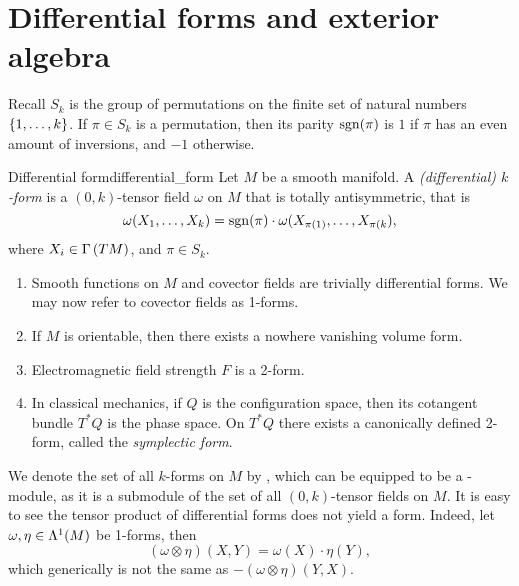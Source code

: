 \section{Differential forms and exterior algebra}

Recall \(S_k\) is the group of permutations on the finite set of natural numbers \(\set{1, \dots, k}\). If \(\pi \in S_k\) is a permutation, then its parity \(\sgn(\pi)\) is \(1\) if \(\pi\) has an even amount of inversions, and \(-1\) otherwise.

\begin{definition}{Differential form}{differential_form}
    Let \(M\) be a smooth manifold. A \emph{(differential) \(k\)-form} is a \((0, k)\)-tensor field \(\omega\) on \(M\) that is totally antisymmetric, that is
    \begin{equation*}
        \omega(X_1, \dots, X_k) = \sgn(\pi)\cdot\omega(X_{\pi(1)}, \dots, X_{\pi(k}),
    \end{equation*}
    where \(X_i \in \sections{TM}\), and \(\pi \in S_k.\)
\end{definition}
\begin{example}
    \begin{enumerate}[label=(\alph*)]
        \item Smooth functions on \(M\) and covector fields are trivially differential forms. We may now refer to covector fields as 1-forms.
        \item If \(M\) is orientable, then there exists a nowhere vanishing volume form.
        \item Electromagnetic field strength \(F\) is a 2-form.
        \item In classical mechanics, if \(Q\) is the configuration space, then its cotangent bundle \(T^\ast Q\) is the phase space. On \(T^\ast Q\) there exists a canonically defined 2-form, called the \emph{symplectic form}.
    \end{enumerate}
\end{example}

We denote the set of all \(k\)-forms on \(M\) by , which can be equipped to be a -module, as it is a submodule of the set of all \((0, k)\)-tensor fields on \(M\). It is easy to see the tensor product of differential forms does not yield a form. Indeed, let \(\omega, \eta \in \forms[1]{M}\) be 1-forms, then
\begin{equation}
    (\omega\otimes\eta)(X, Y) = \omega(X) \cdot \eta(Y),
\end{equation}
which generically is not the same as \(-(\omega \otimes \eta)(Y, X)\).

